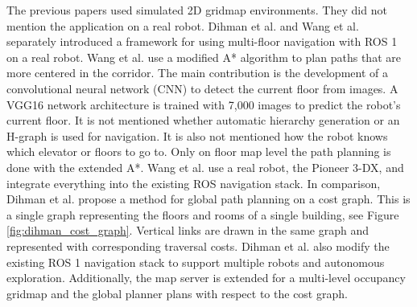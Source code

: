 The previous papers used simulated 2D gridmap environments. They did not mention the application on a real robot. Dihman et al. \cite{dhiman_ros_2020} and Wang et al. \cite{wang_autonomous_2019} separately introduced a framework for using multi-floor navigation with ROS 1 on a real robot. Wang et al. use a modified A* algorithm to plan paths that are more centered in the corridor. The main contribution is the development of a convolutional neural network (CNN) to detect the current floor from images. A VGG16 network architecture is trained with 7,000 images to predict the robot's current floor. It is not mentioned whether automatic hierarchy generation or an H-graph is used for navigation. It is also not mentioned how the robot knows which elevator or floors to go to. Only on floor map level the path planning is done with the extended A*. Wang et al. use a real robot, the Pioneer 3-DX, and integrate everything into the existing ROS navigation stack. In comparison, Dihman et al. propose a method for global path planning on a cost graph. This is a single graph representing the floors and rooms of a single building, see Figure \ref{fig:dihman_cost_graph}. Vertical links are drawn in the same graph and represented with corresponding traversal costs. Dihman et al. also modify the existing ROS 1 navigation stack to support multiple robots and autonomous exploration. Additionally, the map server is extended for a multi-level occupancy gridmap and the global planner plans with respect to the cost graph.

